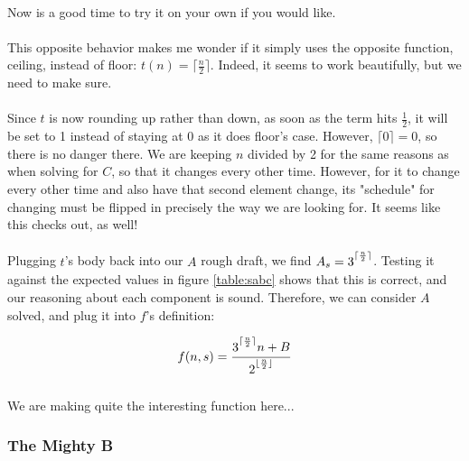 \documentclass[12pt,letterpaper]{article}
\begin{document}
			\paragraph{} Now is a good time to try it on your own if you would like.
			
			
			\paragraph{} This opposite behavior makes me wonder if it simply uses the opposite function, ceiling, instead of floor: $t(n) = \lceil \frac{n}{2} \rceil$. Indeed, it seems to work beautifully, but we need to make sure.
			
			\paragraph{} Since $t$ is now rounding up rather than down, as soon as the term hits $\frac{1}{2}$, it will be set to 1 instead of staying at 0 as it does floor's case. However, $\lceil 0 \rceil = 0$, so there is no danger there. We are keeping $n$ divided by 2 for the same reasons as when solving for $C$, so that it changes every other time. However, for it to change every other time and also have that second element change, its "schedule" for changing must be flipped in precisely the way we are looking for. It seems like this checks out, as well!
			
			\paragraph{} Plugging $t$'s body back into our $A$ rough draft, we find $A_s = 3\strut^{\lceil \frac{n}{2} \rceil}$. Testing it against the expected values in figure \ref{table:sabc} shows that this is correct, and our reasoning about each component is sound. Therefore, we can consider $A$ solved, and plug it into $f$'s definition:
			
			\begin{equation*}
				f(n, s) = \frac{3\strut^{\lceil \frac{n}{2} \rceil} n + B}{2\strut^{\lfloor \frac{n}{2} \rfloor}}
			\end{equation*}
			
			\paragraph{} We are making quite the interesting function here...
			
		\newpage %
		\subsubsection{The Mighty B}
		
\end{document}

